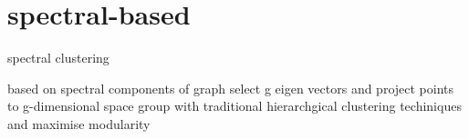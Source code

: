 \documentclass[•]{article}
\begin{document}






%
%

%
%
%
%

%

\section{spectral-based}

spectral clustering

\cite{donetti2004detecting}
based on spectral components of graph
select g eigen vectors and project points to g-dimensional space
group with traditional hierarchgical clustering techiniques and maximise modularity
\end{document}
